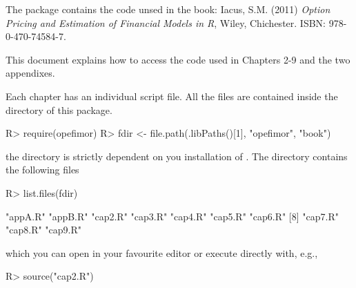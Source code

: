 \documentclass[11pt]{article}
\date{}
\begin{document}
The  package contains the \R{} code unsed in the book:
Iacus, S.M. (2011) {\it Option Pricing and
		Estimation of Financial Models in R}, Wiley, Chichester. ISBN:
        978-0-470-74584-7.

\bigskip

This document explains how to access the \R{} code used in Chapters 2-9 and the two appendixes.
\bigskip
\noindent

Each chapter has an individual \R{} script file. All the files are contained inside the  directory
of this package.
\begin{Schunk}
\begin{Sinput}
R> require(opefimor)
R> fdir <- file.path(.libPaths()[1], "opefimor", "book")
\end{Sinput}
\end{Schunk}
the directory  is strictly dependent on you installation of \R{}. The directory contains the following files
\begin{Schunk}
\begin{Sinput}
R> list.files(fdir)
\end{Sinput}
\begin{Soutput}
 [1] "appA.R" "appB.R" "cap2.R" "cap3.R" "cap4.R" "cap5.R" "cap6.R"
 [8] "cap7.R" "cap8.R" "cap9.R"
\end{Soutput}
\end{Schunk}
which you can open in your favourite editor or execute directly with, e.g.,
\begin{Schunk}
\begin{Sinput}
R> source("cap2.R")
\end{Sinput}
\end{Schunk}
\end{document}
